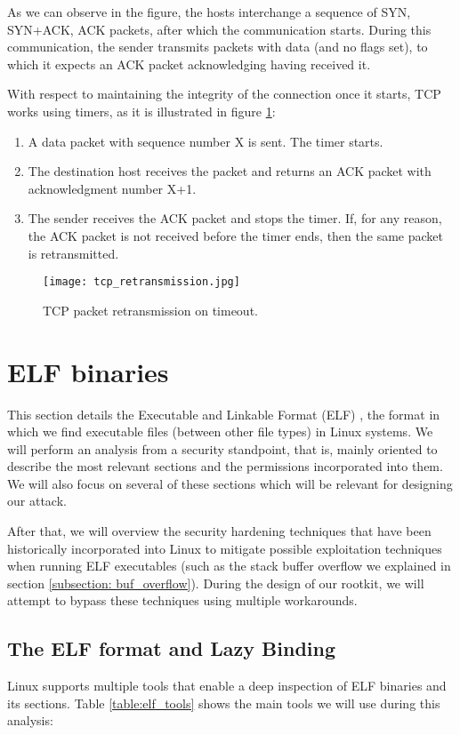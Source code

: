 As we can observe in the figure, the hosts interchange a sequence of SYN, SYN+ACK, ACK packets, after which the communication starts. During this communication, the sender transmits packets with data (and no flags set), to which it expects an ACK packet acknowledging having received it.

With respect to maintaining the integrity of the connection once it starts, TCP works using timers, as it is illustrated in figure \ref{fig:tcp_retransmission}:
\begin{enumerate}
\item A data packet with sequence number X is sent. The timer starts.
\item The destination host receives the packet and returns an ACK packet with acknowledgment number X+1.
\item The sender receives the ACK packet and stops the timer. If, for any reason, the ACK packet is not received before the timer ends, then the same packet is retransmitted.
\end{enumerate}

\begin{figure}[htbp]
	\centering
	\texttt{[image: tcp\_retransmission.jpg]}
	\caption{TCP packet retransmission on timeout.}
	\label{fig:tcp_retransmission}
\end{figure}

\section{ELF binaries} \label{section:elf}
This section details the Executable and Linkable Format (ELF) \cite{elf}, the format in which we find executable files (between other file types) in Linux systems. We will perform an analysis from a security standpoint, that is, mainly oriented to describe the most relevant sections and the permissions incorporated into them. We will also focus on several of these sections which will be relevant for designing our attack.

After that, we will overview the security hardening techniques that have been historically incorporated into Linux to mitigate possible exploitation techniques when running ELF executables (such as the stack buffer overflow we explained in section \ref{subsection: buf_overflow}). During the design of our rootkit, we will attempt to bypass these techniques using multiple workarounds.

\subsection{The ELF format and Lazy Binding} \label{subsection:elf_lazy_binding}
Linux supports multiple tools that enable a deep inspection of ELF binaries and its sections. Table \ref{table:elf_tools} shows the main tools we will use during this analysis:

